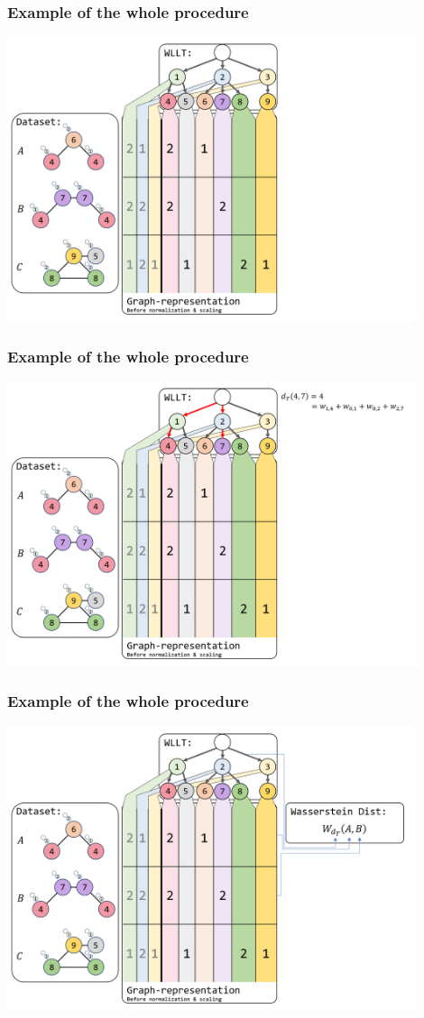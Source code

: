 \begin{frame}[noframenumbering]
	\frametitle{Example of the whole procedure}\vspace{-0.75cm}
	\centering
	\includegraphics[width=0.9\textwidth]{images/WLLTProgram2}
\end{frame}


\begin{frame}[noframenumbering]
	\frametitle{Example of the whole procedure}\vspace{-0.75cm}
	\centering
	\includegraphics[width=0.9\textwidth]{images/WLLTProgram3}
\end{frame}

\begin{frame}[noframenumbering]
\frametitle{Example of the whole procedure}\vspace{-0.75cm}
\centering
\includegraphics[width=0.9\textwidth]{images/WLLTProgram4}
\end{frame}

